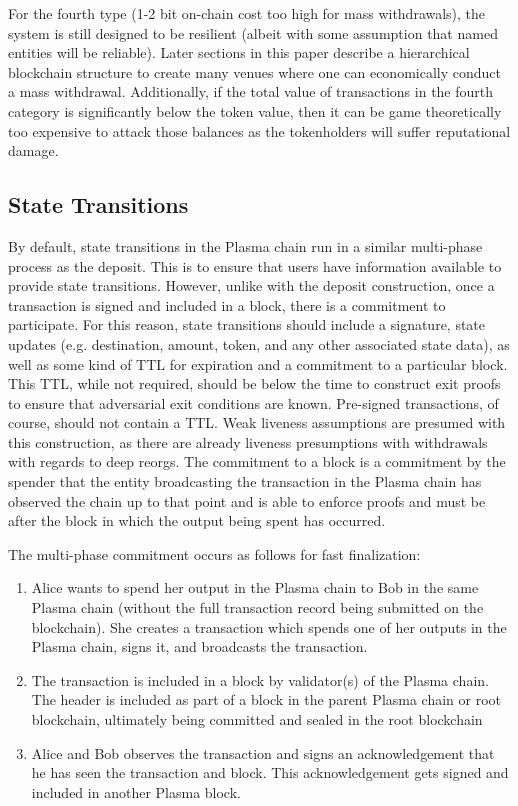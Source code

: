 \documentclass[letterpaper, 11pt]{article}
\begin{document}
For the fourth type (1-2 bit on-chain cost too high for mass withdrawals), the
system is still designed to be resilient (albeit with some assumption that named
entities will be reliable). Later sections in this paper describe a hierarchical
blockchain structure to create many venues where one can economically conduct a
mass withdrawal. Additionally, if the total value of transactions in the fourth
category is significantly below the token value, then it can be game
theoretically too expensive to attack those balances as the tokenholders will
suffer reputational damage.



\subsection{State Transitions}

By default, state transitions in the Plasma chain run in a similar multi-phase
process as the deposit. This is to ensure that users have information available
to provide state transitions. However, unlike with the deposit construction,
once a transaction is signed and included in a block, there is a commitment to
participate. For this reason, state transitions should include a signature,
state updates (e.g. destination, amount, token, and any other associated state
data), as well as some kind of TTL for expiration and a commitment to a
particular block. This TTL, while not required, should be below the time to
construct exit proofs to ensure that adversarial exit conditions are known.
Pre-signed transactions, of course, should not contain a TTL. Weak liveness
assumptions are presumed with this construction, as there are already liveness
presumptions with withdrawals with regards to deep reorgs. The commitment to a
block is a commitment by the spender that the entity broadcasting the
transaction in the Plasma chain has observed the chain up to that point and is
able to enforce proofs and must be after the block in which the output being
spent has occurred.

The multi-phase commitment occurs as follows for fast finalization:
\begin{enumerate}
	\item
		Alice wants to spend her output in the Plasma chain to Bob in
		the same Plasma chain (without the full transaction record being
		submitted on the blockchain). She creates a transaction which
		spends one of her outputs in the Plasma chain, signs it, and
		broadcasts the transaction.
	\item
		The transaction is included in a block by validator(s) of the
		Plasma chain. The header is included as part of a block in the
		parent Plasma chain or root blockchain, ultimately being
		committed and sealed in the root blockchain
	\item
		Alice and Bob observes the transaction and signs an
		acknowledgement that he has seen the transaction and block. This
		acknowledgement gets signed and included in another Plasma
		block.
\end{enumerate}
\end{document}
